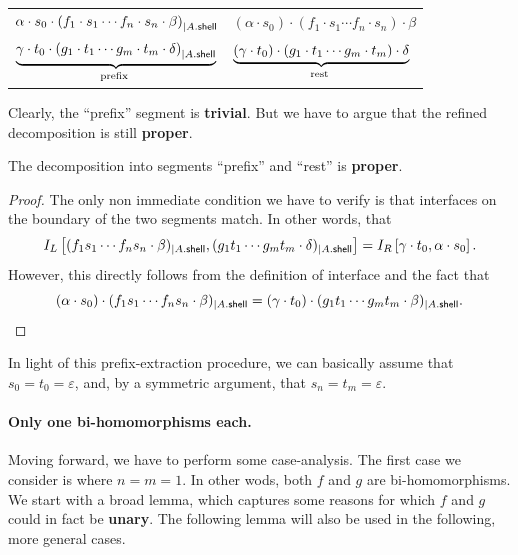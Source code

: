 \begin{center}
    \begin{tabular}{l|l}
        $\alpha \cdot s_0 \cdot \left( f_1 \cdot s_1 \cdots f_n \cdot s_n \cdot \beta \right)_{| A . \mathsf{shell}}$ & $(\alpha \cdot s_0) \cdot (f_1 \cdot s_1 \cdots f_n \cdot s_n) \cdot \beta$ \\
        $\myunderbrace{\gamma \cdot t_0 \cdot \left( g_1 \cdot t_1 \cdots g_m \cdot t_m \cdot \delta \right)_{| \shell{A}}}{\text{prefix}}$ & $\myunderbrace{(\gamma \cdot t_0) \cdot (g_1 \cdot t_1 \cdots g_m \cdot t_m) \cdot \delta}{rest}$
    \end{tabular}
\end{center}

Clearly, the ``prefix'' segment is \textbf{trivial}. But we have to argue that the refined decomposition is still \textbf{proper}.

\begin{claim}
    The decomposition into segments ``prefix'' and ``rest'' is \textbf{proper}.
\end{claim}

\begin{proof}
    The only non immediate condition we have to verify is that interfaces on the boundary of the two segments match. In other words, that
    \[
        I_L \left[ (f_1 s_1 \cdots f_n s_n \cdot \beta)_{| A . \mathsf{shell}}, (g_1 t_1 \cdots g_m t_m \cdot \delta)_{| A . \mathsf{shell}} \right] = I_R \left[ \gamma \cdot t_0, \alpha \cdot s_0 \right].
    \]
    However, this directly follows from the definition of interface and the fact that
    \[
        (\alpha \cdot s_0) \cdot (f_1 s_1 \cdots f_n s_n \cdot \beta)_{| A . \mathsf{shell}} = (\gamma \cdot t_0) \cdot (g_1 t_1 \cdots g_m t_m \cdot \beta)_{| A . \mathsf{shell}}. \qedhere
    \]
\end{proof}

In light of this prefix-extraction procedure, we can basically assume that $s_0 = t_0 = \varepsilon$, and, by a symmetric argument, that $s_n = t_m = \varepsilon$.

\paragraph{Only one bi-homomorphisms each.} Moving forward, we have to perform some case-analysis. The first case we consider is where $n = m = 1$. In other wods, both $f$ and $g$ are bi-homomorphisms. We start with a broad lemma, which captures some reasons for which $f$ and $g$ could in fact be \textbf{unary}. The following lemma will also be used in the following, more general cases.

